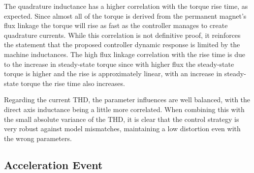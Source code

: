 \documentclass[9pt,conference]{IEEEtran}
\begin{document}
The quadrature inductance has a higher correlation with the torque rise time, as expected. Since almost all of the torque is derived from the permanent magnet's flux linkage the torque will rise as fast as the controller manages to create quadrature currents. While this correlation is not definitive proof, it reinforces the statement that the proposed controller dynamic response is limited by the machine inductances. The high flux linkage correlation with the rise time is due to the increase in steady-state torque since with higher flux the steady-state torque is higher and the rise is approximately linear, with an increase in steady-state torque the rise time also increases.

Regarding the current THD, the parameter influences are well balanced, with the direct axis inductance being a little more correlated. When combining this with the small absolute variance of the THD, it is clear that the control strategy is very robust against model mismatches, maintaining a low distortion even with the wrong parameters.

\subsection{Acceleration Event}
\label{section:acceleration}%
\end{document}
